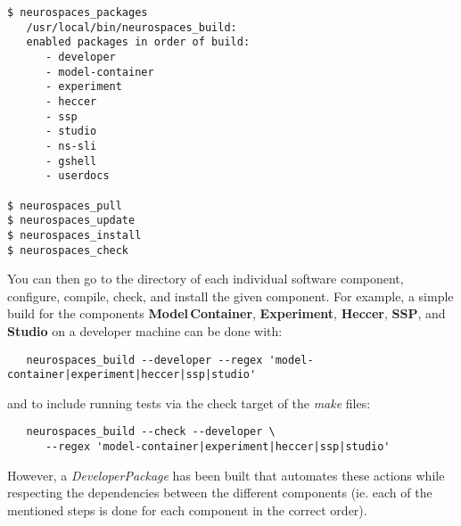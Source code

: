 \documentclass[12pt]{article}
\begin{document}
\begin{enumerate}
\begin{verbatim}
$ neurospaces_packages
   /usr/local/bin/neurospaces_build:
   enabled packages in order of build:
      - developer
      - model-container
      - experiment
      - heccer
      - ssp
      - studio
      - ns-sli
      - gshell
      - userdocs

$ neurospaces_pull
$ neurospaces_update
$ neurospaces_install
$ neurospaces_check
\end{verbatim}
\end{enumerate}

You can then go to the directory of each individual software component, configure, compile, check, and install the given component. For example, a simple build for the components {\bf Model\,Container}, {\bf Experiment}, {\bf Heccer}, {\bf SSP}, and {\bf Studio} on a developer machine can be done with:  
\begin{verbatim}
   neurospaces_build --developer --regex 'model-container|experiment|heccer|ssp|studio'
\end{verbatim}
and to include running tests via the check target of the {\it make} files:
\begin{verbatim}
   neurospaces_build --check --developer \
      --regex 'model-container|experiment|heccer|ssp|studio'
\end{verbatim}
However, a {\it DeveloperPackage} has been built that automates these actions while respecting the dependencies between the different components (ie. each of the mentioned steps is done for each component in the correct order).




\end{document}

